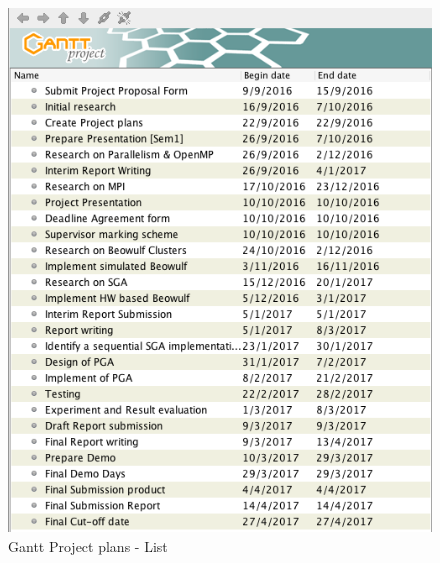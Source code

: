 \begin{figure}[!htb]
  \center
  \includegraphics[width=.7 \linewidth]{figs/project_plans_list.png}
  \caption{Gantt Project plans - List}
  \label{fig:project_plans}
\end{figure}

